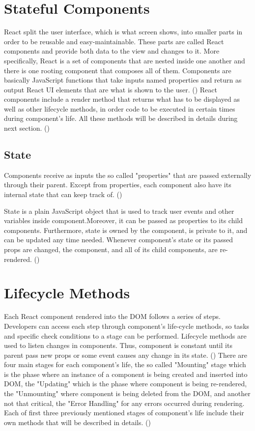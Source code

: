 \section{Stateful Components}

React split the user interface, which is what screen shows, into smaller parts in order to be reusable and easy-maintainable. These parts are called React components and provide both data to the view and changes to it. More specifically, React is a set of components that are nested inside one another and there is one rooting component that composes all of them. Components are basically JavaScript functions that take inputs named properties and return as output React UI elements that are what is shown to the user. (\cite{Reference14})  React components include a render method that returns what has to be displayed as well as other lifecycle methods, in order code to be executed in certain times during component's life. All these methods will be described in details during next section. (\cite{Reference16}) \par

\subsection{State}
Components receive as inputs the so called "properties" that are passed externally through their parent. Except from properties, each component also have its internal state that can keep track of. (\cite{Reference13}) \par 
State is a plain JavaScript object that is used to track user events and other variables inside component.Moreover, it can be passed as properties to its child components. Furthermore, state is owned by the component, is private to it, and can be updated any time needed. Whenever component's state or its passed props are changed, the component, and all of its child components, are re-rendered. (\cite{Reference10}) \par

\section{Lifecycle Methods}

Each React component rendered into the DOM follows a series of steps. Developers can access each step through component's life-cycle methods, so tasks and specific check conditions to a stage can be performed. Lifecycle methods are used to listen changes in components. Thus, component is constant until its parent pass new props or some event causes any change in its state. (\cite{Reference13}) There are four main stages for each component's life, the so called "Mounting" stage which is the phase where an instance of a component is being created and inserted into DOM, the "Updating" which is the phase where component is being re-rendered, the "Unmounting" where component is being deleted from the DOM, and another not that critical, the "Error Handling" for any errors occurred during rendering. Each of first three previously mentioned stages of component's life include their own methods that will be described in details. (\cite{Reference16})  \par

